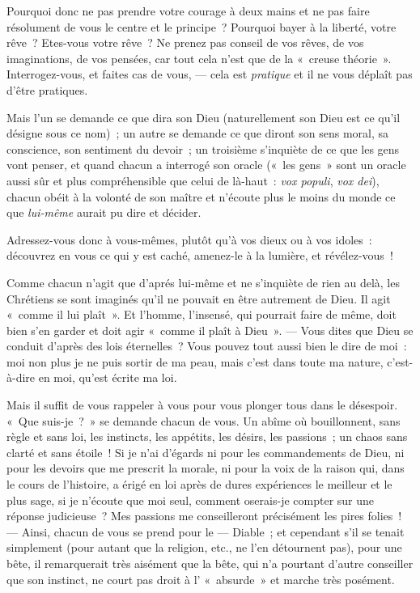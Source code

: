 \documentclass[french,twoside]{book} %
\begin{document}
Pourquoi donc ne pas prendre votre courage à deux mains et ne pas faire résolument de vous le centre et le principe ? Pourquoi bayer à la liberté, votre rêve ? Etes-vous votre rêve ? Ne prenez pas conseil de vos rêves, de vos imaginations, de vos pensées, car tout cela n’est que de la « creuse théorie ». Interrogez-vous, et faites cas de vous, — cela est \emph{pratique} et il ne vous déplaît pas d’être pratiques.\par
Mais l’un se demande ce que dira son Dieu (naturellement son Dieu est ce qu’il désigne sous ce nom) ; un autre se demande ce que diront son sens moral, sa conscience, son sentiment du devoir ; un troisième s’inquiète de ce que les gens vont penser, et quand chacun a interrogé son oracle (« les gens » sont un oracle aussi sûr et plus compréhensible que celui de là-haut : \emph{vox populi}, \emph{vox dei}), chacun obéit à la volonté de son maître et n’écoute plus le moins du monde ce que \emph{lui-même} aurait pu dire et décider.\par
Adressez-vous donc à vous-mêmes, plutôt qu’à vos dieux ou à vos idoles : découvrez en vous ce qui y est caché, amenez-le à la lumière, et révélez-vous !\par
Comme chacun n’agit que d’aprés lui-même et ne s’inquiète de rien au delà, les Chrétiens se sont imaginés qu’il ne pouvait en être autrement de Dieu. Il agit « comme il lui plaît ». Et l’homme, l’insensé, qui pourrait faire de même, doit bien s’en garder et doit agir « comme il plaît à Dieu ». — Vous dites que Dieu  se conduit d’après des lois éternelles ? Vous pouvez tout aussi bien le dire de moi : moi non plus je ne puis sortir de ma peau, mais c’est dans toute ma nature, c’est-à-dire en moi, qu’est écrite ma loi.\par
Mais il suffit de vous rappeler à vous pour vous plonger tous dans le désespoir. « Que suis-je ? » se demande chacun de vous. Un abîme où bouillonnent, sans règle et sans loi, les instincts, les appétits, les désirs, les passions ; un chaos sans clarté et sans étoile ! Si je n’ai d’égards ni pour les commandements de Dieu, ni pour les devoirs que me prescrit la morale, ni pour la voix de la raison qui, dans le cours de l’histoire, a érigé en loi après de dures expériences le meilleur et le plus sage, si je n’écoute que moi seul, comment oserais-je compter sur une réponse judicieuse ? Mes passions me conseilleront précisément les pires folies ! — Ainsi, chacun de vous se prend pour le — Diable ; et cependant s’il se tenait simplement (pour autant que la religion, etc., ne l’en détournent pas), pour une bête, il remarquerait très aisément que la bête, qui n’a pourtant d’autre conseiller que son instinct, ne court pas droit à l’ « absurde » et marche très posément.\par
\end{document}
